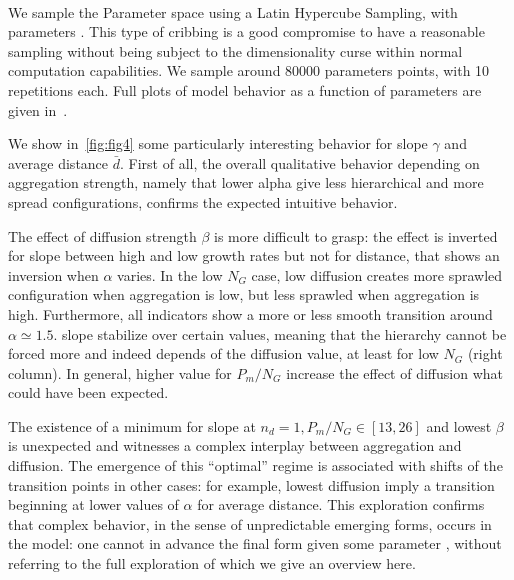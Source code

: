 \documentclass[10pt,letterpaper]{article}
\begin{document}
\paragraph{}



We sample the Parameter space using a Latin Hypercube Sampling, with parameters . This type of cribbing is a good compromise to have a reasonable sampling without being subject to the dimensionality curse within normal computation capabilities. We sample around 80000 parameters points, with 10 repetitions each. Full plots of model behavior as a function of parameters are given in~. 

We show in~\ref{fig:fig4} some particularly interesting behavior for slope $\gamma$ and average distance $\bar{d}$. First of all, the overall qualitative behavior depending on aggregation strength, namely that lower alpha give less hierarchical and more spread configurations, confirms the expected intuitive behavior.

The effect of diffusion strength $\beta$ is more difficult to grasp: the effect is inverted for slope between high and low growth rates but not for distance, that shows an inversion when $\alpha$ varies. In the low $N_G$ case, low diffusion creates more sprawled configuration when aggregation is low, but less sprawled when aggregation is high. Furthermore, all indicators show a more or less smooth transition around $\alpha \simeq 1.5$.  slope stabilize over certain values, meaning that the hierarchy cannot be forced more and indeed depends of the diffusion value, at least for low $N_G$ (right column). In general, higher value for $P_m/N_G$ increase the effect of diffusion what could have been expected.

The existence of a minimum for  slope at $n_d=1,P_m/N_G\in\left[13,26\right]$ and lowest $\beta$ is unexpected and witnesses a complex interplay between aggregation and diffusion. The emergence of this ``optimal'' regime is associated with shifts of the transition points in other cases: for example, lowest diffusion  imply a transition beginning at lower values of $\alpha$ for  average distance. This exploration confirms that complex behavior, in the sense of unpredictable emerging forms, occurs in the model: one cannot  in advance the final form given some parameter , without referring to the full exploration of which we give an overview here.
\end{document}

